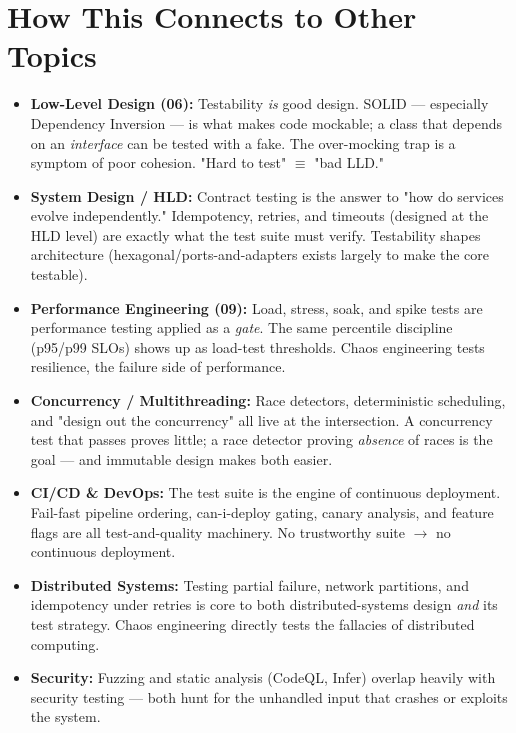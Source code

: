 \documentclass[11pt]{article}
\begin{document}
\section{How This Connects to Other Topics}\label{how-this-connects-to-other-topics}

\begin{itemize}
\item
  \textbf{Low-Level Design (06):} Testability \emph{is} good design. SOLID --- especially Dependency Inversion --- is what makes code mockable; a class that depends on an \emph{interface} can be tested with a fake. The over-mocking trap is a symptom of poor cohesion. "Hard to test" \(\equiv\) "bad LLD."
\item
  \textbf{System Design / HLD:} Contract testing is the answer to "how do services evolve independently." Idempotency, retries, and timeouts (designed at the HLD level) are exactly what the test suite must verify. Testability shapes architecture (hexagonal/ports-and-adapters exists largely to make the core testable).
\item
  \textbf{Performance Engineering (09):} Load, stress, soak, and spike tests are performance testing applied as a \emph{gate}. The same percentile discipline (p95/p99 SLOs) shows up as load-test thresholds. Chaos engineering tests resilience, the failure side of performance.
\item
  \textbf{Concurrency / Multithreading:} Race detectors, deterministic scheduling, and "design out the concurrency" all live at the intersection. A concurrency test that passes proves little; a race detector proving \emph{absence} of races is the goal --- and immutable design makes both easier.
\item
  \textbf{CI/CD \& DevOps:} The test suite is the engine of continuous deployment. Fail-fast pipeline ordering, can-i-deploy gating, canary analysis, and feature flags are all test-and-quality machinery. No trustworthy suite \(\rightarrow\) no continuous deployment.
\item
  \textbf{Distributed Systems:} Testing partial failure, network partitions, and idempotency under retries is core to both distributed-systems design \emph{and} its test strategy. Chaos engineering directly tests the fallacies of distributed computing.
\item
  \textbf{Security:} Fuzzing and static analysis (CodeQL, Infer) overlap heavily with security testing --- both hunt for the unhandled input that crashes or exploits the system.
\end{itemize}
\end{document}
